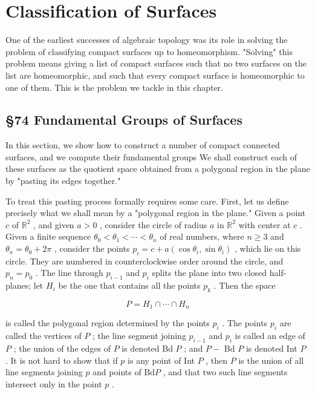 \chapter{Classification of Surfaces}

One of the earliest successes of algebraic topology was its role in solving the problem of classifying compact surfaces up to homeomorphism. "Solving" this problem means giving a list of compact surfaces such that no two surfaces on the list are homeomorphic, and such that every compact surface is homeomorphic to one of them. This is the problem we tackle in this chapter.

\section*{ \S 74 Fundamental Groups of Surfaces}

In this section, we show how to construct a number of compact connected surfaces, and we compute their fundamental groups We shall construct each of these surfaces as the quotient space obtained from a polygonal region in the plane by "pasting its edges together."

To treat this pasting process formally requires some care. First, let us define precisely what we shall mean by a "polygonal region in the plane." Given a point \(c\) of \({\mathbb{R}}^{2}\) , and given \(a > 0\) , consider the circle of radius \(a\) in \({\mathbb{R}}^{2}\) with center at \(c\) . Given a finite sequence \({\theta }_{0} < {\theta }_{1} < \cdots  < {\theta }_{n}\) of real numbers, where \(n \geq  3\) and \({\theta }_{n} = {\theta }_{0} + {2\pi }\) , consider the points \({p}_{i} = c + a\left( {\cos {\theta }_{i},\sin {\theta }_{i}}\right)\) , which lie on this circle. They are numbered in counterclockwise order around the circle, and \({p}_{n} = {p}_{0}\) . The line through \({p}_{i - 1}\) and \({p}_{i}\) splits the plane into two closed half-planes; let \({H}_{i}\) be the one that contains all the points \({p}_{k}\) . Then the space

\[
P = {H}_{1} \cap  \cdots  \cap  {H}_{n}
\]

is called the polygonal region determined by the points \({p}_{i}\) . The points \({p}_{i}\) are called the vertices of \(P\) ; the line segment joining \({p}_{i - 1}\) and \({p}_{i}\) is called an edge of \(P\) ; the union of the edges of \(P\) is denoted Bd \(P\) ; and \(P -\) Bd \(P\) is denoted Int \(P\) . It is not hard to show that if \(p\) is any point of Int \(P\) , then \(P\) is the union of all line segments joining \(p\) and points of \(\mathrm{{Bd}}P\) , and that two such line segments intersect only in the point \(p\) .

